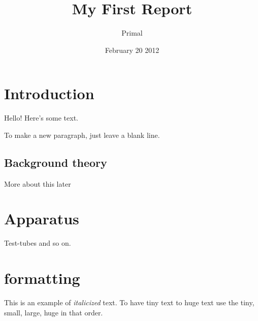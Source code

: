 \documentclass{article} %
\title{My First Report}
\author{Primal}
\date{February 20 2012}
\begin{document}
\maketitle %
\tableofcontents %
\section{Introduction}
Hello!  Here's some text.

To make a new paragraph, just leave a blank line.

\subsection{Background theory}
More about this later

\section{Apparatus}
Test-tubes and so on.

\section{formatting}
This is an example of \textit{italicized} text. To have 
tiny {\tiny text} to huge {\huge text} use the tiny, small, large,
huge in that order.
\end{document}
